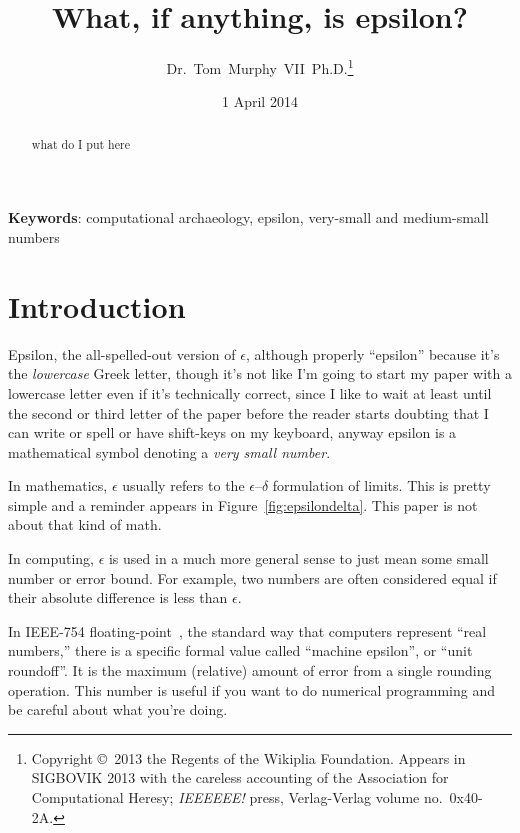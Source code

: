 \documentclass[twocolumn]{article}
\begin{document}
 

\title{What, if anything, is epsilon?}
\author{Dr.~Tom~Murphy~VII~Ph.D.\thanks{
Copyright \copyright\ 2013 the Regents of the Wikiplia
Foundation. Appears in SIGBOVIK 2013 with the careless accounting of the
Association for Computational Heresy; {\em IEEEEEE!} press,
Verlag-Verlag volume no.~0x40-2A.
}
}


\renewcommand\>{$>$}
\newcommand\<{$<$}

\date{1 April 2014}

\maketitle

\begin{abstract}
what do I put here
\end{abstract}

\vspace{1em}
{\noindent \small {\bf Keywords}:
 computational archaeology, epsilon, very-small and medium-small numbers
}

\section*{Introduction}

Epsilon, the all-spelled-out version of $\epsilon$, although properly
``epsilon'' because it's the {\em lowercase} Greek letter, though it's
not like I'm going to start my paper with a lowercase letter even if
it's technically correct, since I like to wait at least until the
second or third letter of the paper before the reader starts doubting
that I can write or spell or have shift-keys on my keyboard, anyway
epsilon is a mathematical symbol denoting a {\em very small number}.


In mathematics, $\epsilon$ usually refers to the
$\epsilon$--$\delta$ formulation of limits. This is pretty simple and a
reminder appears in Figure~\ref{fig:epsilondelta}. This paper is not
about that kind of math.

In computing, $\epsilon$ is used in a much more general sense to just
mean some small number or error bound. For example, two numbers are
often considered equal if their absolute difference is less than
$\epsilon$.

In IEEE-754 floating-point~\cite{ieee754}, the standard way that
computers represent ``real numbers,'' there is a specific formal value
called ``machine epsilon'', or ``unit roundoff''. It is the maximum
(relative) amount of error from a single rounding operation. This
number is useful if you want to do numerical programming and be
careful about what you're doing.
\end{document}
